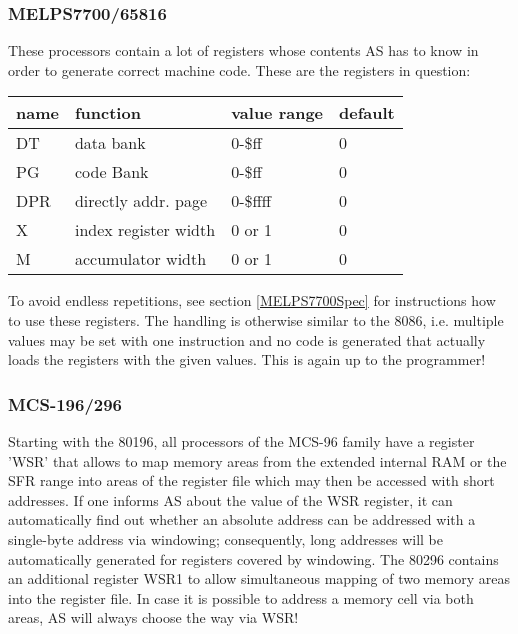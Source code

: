 \documentclass[12pt,twoside]{report}
\begin{document}

\subsubsection{MELPS7700/65816}

These processors contain a lot of registers whose contents AS has to know
in order to generate correct machine code.  These are the registers
in question:
\begin{center}\begin{tabular}{|l|l|l|l|}
\hline
name   & function             & value range   & default \\
\hline
\hline
DT     & data bank            & 0-\$ff        &  0 \\
PG     & code Bank            & 0-\$ff        &  0 \\
DPR    & directly addr. page  & 0-\$ffff      &  0 \\
X      & index register width & 0 or 1        &  0 \\
M      & accumulator width    & 0 or 1        &  0 \\
\hline
\end{tabular}\end{center}
\par
To avoid endless repetitions, see section \ref{MELPS7700Spec} for
instructions how to use these registers.  The handling is otherwise
similar to the 8086, i.e. multiple values may be set with one instruction
and no code is generated that actually loads the registers with the given
values.  This is again up to the programmer!


\subsubsection{MCS-196/296}

Starting with the 80196, all processors of the MCS-96 family have a
register 'WSR' that allows to map memory areas from the extended
internal RAM or the SFR range into areas of the register file which
may then be accessed with short addresses.  If one informs AS about
the value of the WSR register, it can automatically find out whether
an absolute address can be addressed with a single-byte address via
windowing; consequently, long addresses will be automatically generated
for registers covered by windowing.  The 80296 contains an additional
register WSR1 to allow simultaneous mapping of two memory areas into
the register file.  In case it is possible to address a memory cell
via both areas, AS will always choose the way via WSR!
\end{document}
